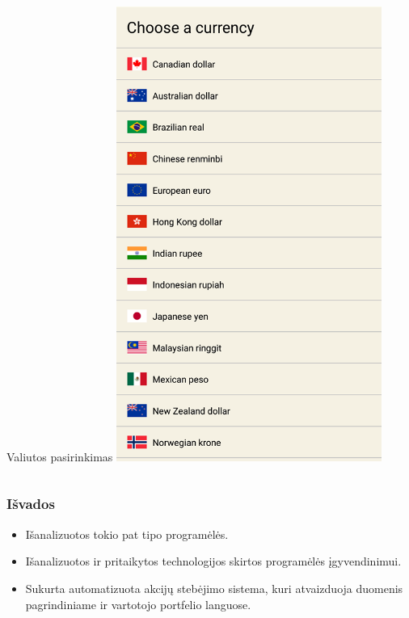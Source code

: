 \documentclass[hyperref={breaklinks=true},fleqn,mathserif]{beamer}
\begin{document}
\begin{frame}
\begin{columns}
\begin{column}{.48\textwidth}
\begin{block}{Valiutos pasirinkimas}
					\includegraphics[width=0.65\textwidth, height=0.733\textheight]{Pav/currencySelect.png}\centering
				\end{block}
			\end{column}
		\end{columns}
	\end{frame}
	\begin{frame}
		\frametitle{Išvados}
		\begin{itemize}
			\item Išanalizuotos tokio pat tipo programėlės.
			\item Išanalizuotos ir pritaikytos technologijos skirtos programėlės įgyvendinimui.
			\item Sukurta automatizuota akcijų stebėjimo sistema, kuri atvaizduoja duomenis pagrindiniame ir vartotojo portfelio languose.
		\end{itemize}
	\end{frame}
\end{document}
